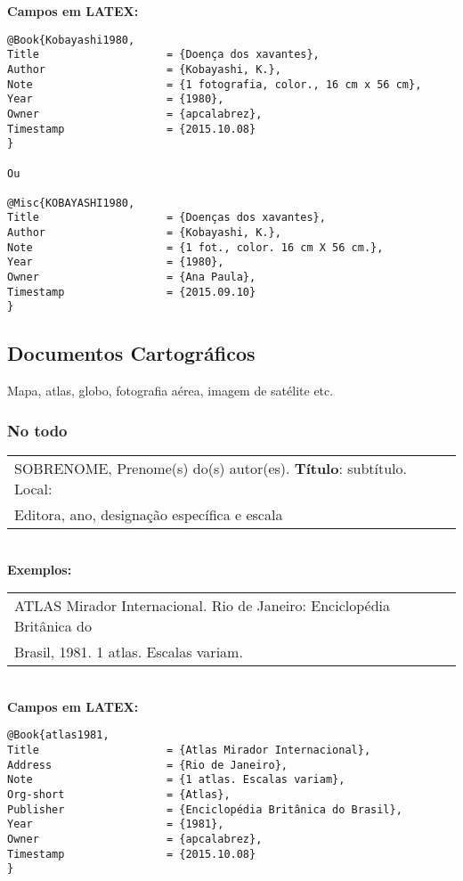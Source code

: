 \textbf{Campos em LATEX:} 

\begin{verbatim}
@Book{Kobayashi1980,
Title                    = {Doença dos xavantes},
Author                   = {Kobayashi, K.},
Note                     = {1 fotografia, color., 16 cm x 56 cm},
Year                     = {1980},
Owner                    = {apcalabrez},
Timestamp                = {2015.10.08}
}

Ou

@Misc{KOBAYASHI1980,
Title                    = {Doenças dos xavantes},
Author                   = {Kobayashi, K.},
Note                     = {1 fot., color. 16 cm X 56 cm.},
Year                     = {1980},
Owner                    = {Ana Paula},
Timestamp                = {2015.09.10}
}
\end{verbatim}
\subsection{Documentos Cartográficos}

Mapa, atlas, globo, fotografia aérea, imagem de satélite etc. 
\subsubsection{No todo}

\begin{tabular}{|l|c|} \hline
SOBRENOME, Prenome(s) do(s) autor(es). \textbf{Título}: subtítulo. Local: \\
Editora, ano, designação específica e escala
	\\\hline
\end{tabular} \\

\textbf{Exemplos:} \\

\begin{tabular}{|l|c|} \hline
ATLAS Mirador Internacional. Rio de Janeiro: Enciclopédia Britânica do\\
Brasil, 1981. 1 atlas. Escalas variam. 
	\\\hline
\end{tabular} \\

\textbf{Campos em LATEX:} 

\begin{verbatim}
@Book{atlas1981,
Title                    = {Atlas Mirador Internacional},
Address                  = {Rio de Janeiro},
Note                     = {1 atlas. Escalas variam},
Org-short                = {Atlas},
Publisher                = {Enciclopédia Britânica do Brasil},
Year                     = {1981},
Owner                    = {apcalabrez},
Timestamp                = {2015.10.08}
}
\end{verbatim}


